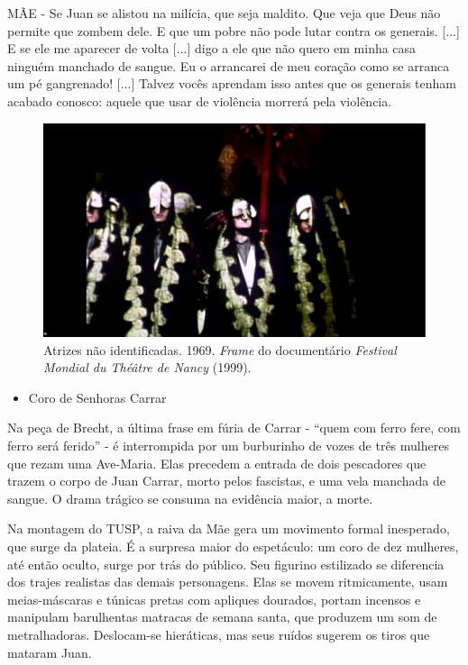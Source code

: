 MÃE - Se Juan se alistou na milícia, que seja maldito. Que veja que Deus
não permite que zombem dele. E que um pobre não pode lutar contra os
generais. {[}...{]} E se ele me aparecer de volta {[}...{]} digo a ele
que não quero em minha casa ninguém manchado de sangue. Eu o arrancarei
de meu coração como se arranca um pé gangrenado! {[}...{]} Talvez vocês
aprendam isso antes que os generais tenham acabado conosco: aquele que
usar de violência morrerá pela violência.

\begin{figure}
\includegraphics[width=\columnwidth]{./media/IMAGEM52.png}
\caption{Atrizes não identificadas. 1969. \textit{Frame} do documentário
\textit{Festival Mondial du Théâtre de Nancy} (1999).}
\end{figure}

\begin{itemize}
\item
  Coro de Senhoras Carrar
\end{itemize}

Na peça de Brecht, a última frase em fúria de Carrar - “quem com ferro
fere, com ferro será ferido” - é interrompida por um burburinho de vozes
de três mulheres que rezam uma Ave-Maria. Elas precedem a entrada de
dois pescadores que trazem o corpo de Juan Carrar, morto pelos
fascistas, e uma vela manchada de sangue. O drama trágico se consuma na
evidência maior, a morte.

Na montagem do TUSP, a raiva da Mãe gera um movimento formal inesperado,
que surge da plateia. É a surpresa maior do espetáculo: um coro de dez
mulheres, até então oculto, surge por trás do público. Seu figurino
estilizado se diferencia dos trajes realistas das demais personagens.
Elas se movem ritmicamente, usam meias-máscaras e túnicas pretas com
apliques dourados, portam incensos e manipulam barulhentas matracas de
semana santa, que produzem um som de metralhadoras. Deslocam-se
hieráticas, mas seus ruídos sugerem os tiros que mataram Juan.

